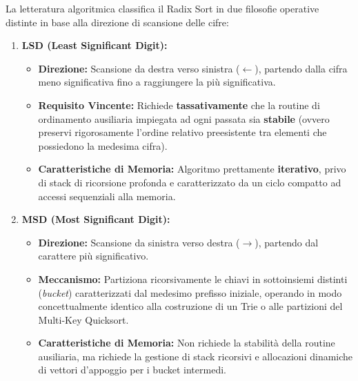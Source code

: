 La letteratura algoritmica classifica il Radix Sort in due filosofie operative distinte in base alla direzione di scansione delle cifre:

\begin{enumerate}
  \item \textbf{LSD (Least Significant Digit):}
  \begin{itemize}
    \item \textbf{Direzione:} Scansione da destra verso sinistra ($\leftarrow$), partendo dalla cifra meno significativa fino a raggiungere la pi\`u significativa.
    \item \textbf{Requisito Vincente:} Richiede \textbf{tassativamente} che la routine di ordinamento ausiliaria impiegata ad ogni passata sia \textbf{stabile} (ovvero preservi rigorosamente l'ordine relativo preesistente tra elementi che possiedono la medesima cifra).
    \item \textbf{Caratteristiche di Memoria:} Algoritmo prettamente \textbf{iterativo}, privo di stack di ricorsione profonda e caratterizzato da un ciclo compatto ad accessi sequenziali alla memoria.
  \end{itemize}
  \item \textbf{MSD (Most Significant Digit):}
  \begin{itemize}
    \item \textbf{Direzione:} Scansione da sinistra verso destra ($\rightarrow$), partendo dal carattere pi\`u significativo.
    \item \textbf{Meccanismo:} Partiziona ricorsivamente le chiavi in sottoinsiemi distinti (\textit{bucket}) caratterizzati dal medesimo prefisso iniziale, operando in modo concettualmente identico alla costruzione di un Trie o alle partizioni del Multi-Key Quicksort.
    \item \textbf{Caratteristiche di Memoria:} Non richiede la stabilit\`a della routine ausiliaria, ma richiede la gestione di stack ricorsivi e allocazioni dinamiche di vettori d'appoggio per i bucket intermedi.
  \end{itemize}
\end{enumerate}

